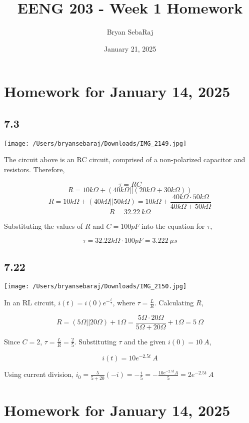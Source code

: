 \documentclass{article}
\title{EENG 203 - Week 1 Homework}
\author{Bryan SebaRaj}
\date{January 21, 2025}
\begin{document}
\maketitle

\section*{Homework for January 14, 2025}

\subsection*{7.3}

\texttt{[image: /Users/bryansebaraj/Downloads/IMG\_2149.jpg]}

The circuit above is an RC circuit, comprised of a non-polarized capacitor and resistors. Therefore,

$$\tau = RC$$
$$R=10 k\Omega + (40 k\Omega || (20 k\Omega + 30 k\Omega))$$
$$R=10 k\Omega + (40 k\Omega || 50 k\Omega)=10 k\Omega + \frac{40 k\Omega \cdot 50 k\Omega}{40 k\Omega + 50 k\Omega}$$
$$R=32.22 \ k\Omega$$

Substituting the values of $R$ and $C=100 pF$ into the equation for $\tau$,

$$\tau = 32.22 k\Omega \cdot 100 pF = 3.222 \ \mu s$$

\subsection*{7.22}

\texttt{[image: /Users/bryansebaraj/Downloads/IMG\_2150.jpg]}

In an RL circuit, $i(t)=i(0)e^{-\frac{t}{\tau}}$, where $\tau = \frac{L}{R}$. Calculating $R$,

$$R=(5\Omega || 20 \Omega) + 1 \Omega = \frac{5 \Omega \cdot 20 \Omega}{5 \Omega + 20 \Omega} + 1 \Omega = 5 \ \Omega$$

Since $C=2$, $\tau = \frac{L}{R} = \frac{2}{5}$. Substituting $\tau$ and the given $i(0)=10 \ A$, 

$$i(t)=10e^{-2.5t} \ A$$

Using current division, $i_0=\frac{5}{5+20}(-i)=-\frac{i}{5}=-\frac{10e^{-2.5t}A}{5}=2e^{-2.5t} \ A$

\section*{Homework for January 14, 2025}
\end{document}

